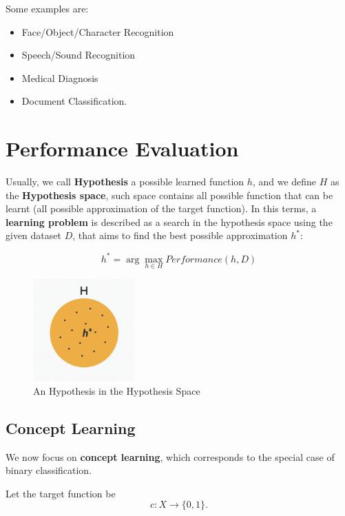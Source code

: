 \documentclass[10pt, letterpaper]{report}
\begin{document}
\bigskip
Some examples are:\begin{itemize}
	\item Face/Object/Character Recognition
	\item Speech/Sound Recognition
	\item Medical Diagnosis
	\item Document Classification.
\end{itemize}

\bigskip
\section{Performance Evaluation}

Usually, we call \textbf{Hypothesis} a possible learned function $h$, and we define $H$ as the \textbf{Hypothesis space}, such space contains all possible function that can be learnt (all possible approximation of the target function). In this terms, a \textbf{learning problem} is described as a search in the hypothesis space using the given dataset $D$, that aims to find the best possible approximation $h^*$:

\begin{equation}\label{sol_hypothesis}
	h^*=\arg \max_{h\in H} Performance(h,D)
\end{equation}

\bigskip
\begin{figure}[h!]
	\centering
	\includegraphics[width=0.35\textwidth]{images/HypotesisSpace.png}
	\caption{An Hypothesis in the Hypothesis Space}
	\label{img:HypothesisSpace}
\end{figure}

\subsection{Concept Learning}

We now focus on \textbf{concept learning}, which corresponds to the special case of binary classification.

\bigskip
Let the target function be
\begin{equation}
	c : X \rightarrow \{0,1\}.
\end{equation}
\end{document}
